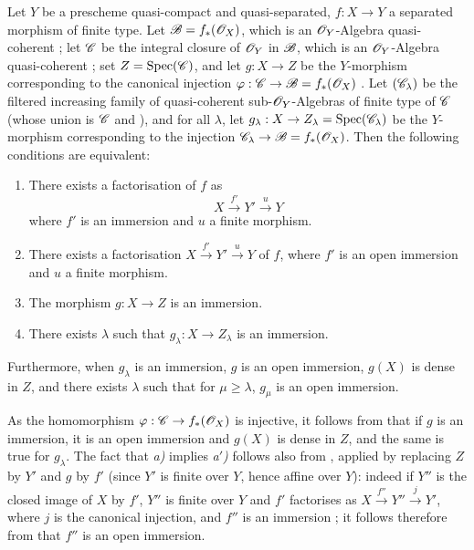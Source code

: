 \begin{proposition}[8.12.3]
\label{IV.8.12.3}
Let $Y$ be a prescheme quasi-compact and quasi-separated, $f:X\to Y$ a separated morphism of finite type.
Let $\mathscr{B}=f_*(\mathscr{O}_X)$, which is an $\mathscr{O}_Y$-Algebra quasi-coherent ; let $\mathscr{C}$ be the integral closure of $\mathscr{O}_Y$ in $\mathscr{B}$, which is an $\mathscr{O}_Y$-Algebra quasi-coherent ; set $Z=\operatorname{Spec}(\mathscr{C})$, and let $g:X\to Z$ be the $Y$-morphism corresponding to the canonical injection $\varphi:\mathscr{C}\to\mathscr{B}=f_*(\mathscr{O}_X)$ . Let $(\mathscr{C}_\lambda)$ be the filtered increasing family of quasi-coherent sub-$\mathscr{O}_Y$-Algebras of finite type of $\mathscr{C}$ (whose union is $\mathscr{C}$  and ), and for all $\lambda$, let $g_\lambda:X\to Z_\lambda=\operatorname{Spec}(\mathscr{C}_\lambda)$ be the $Y$-morphism corresponding to the injection $\mathscr{C}_\lambda\to\mathscr{B}=f_*(\mathscr{O}_X)$.
Then the following conditions are equivalent:
\begin{enumerate}[label=\emph{\alph*)}]
  \item[\emph{a)}] There exists a factorisation of $f$ as
\[
X\xrightarrow{f'}Y'\xrightarrow{u}Y
\]
where $f'$ is an immersion and $u$ a finite morphism.
  \item[\emph{a$'$)}] There exists a factorisation $X\xrightarrow{f'}Y'\xrightarrow{u}Y$ of $f$, where $f'$ is an open immersion and $u$ a finite morphism.
  \item[\emph{b)}] The morphism $g:X\to Z$ is an immersion.
  \item[\emph{c)}] There exists $\lambda$ such that $g_\lambda:X\to Z_\lambda$ is an immersion.
\end{enumerate}
Furthermore, when $g_\lambda$ is an immersion, $g$ is an open immersion, $g(X)$ is dense in $Z$, and there exists $\lambda$ such that for $\mu\geqslant\lambda$, $g_\mu$ is an open immersion.
\end{proposition}

As the homomorphism $\varphi:\mathscr{C}\to f_*(\mathscr{O}_X)$ is injective, it follows from  that if $g$ is an immersion, it is an open immersion and $g(X)$ is dense in $Z$, and the same is true for $g_\lambda$.
The fact that \emph{a)} implies \emph{a$'$)} follows also from , applied by replacing $Z$ by $Y'$ and $g$ by $f'$ (since $Y'$ is finite over $Y$, hence affine over $Y$): indeed if $Y''$ is the closed image of $X$ by $f'$, $Y''$ is finite over $Y$ and $f'$ factorises as $X\xrightarrow{f''}Y''\xrightarrow{j}Y'$, where $j$ is the canonical injection, and $f''$ is an immersion ; it follows therefore from  that $f''$ is an open immersion.

